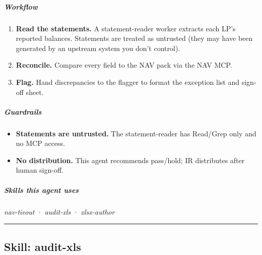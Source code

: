 \documentclass[11pt]{article}
\begin{document}
\subparagraph{Workflow}\mbox{}\par

\begin{enumerate}[leftmargin=*,itemsep=2pt,topsep=2pt]
\item {} \textbf{Read the statements.} A statement-reader worker extracts each LP's reported balances. Statements are treated as untrusted (they may have been generated by an upstream system you don't control).
\item {} \textbf{Reconcile.} Compare every field to the NAV pack via the NAV MCP.
\item {} \textbf{Flag.} Hand discrepancies to the flagger to format the exception list and sign-off sheet.
\end{enumerate}

\subparagraph{Guardrails}\mbox{}\par

\begin{itemize}[leftmargin=*,itemsep=2pt,topsep=2pt]
\item {} \textbf{Statements are untrusted.} The statement-reader has Read/Grep only and no MCP access.
\item {} \textbf{No distribution.} This agent recommends pass/hold; IR distributes after human sign-off.
\end{itemize}

\subparagraph{Skills this agent uses}\mbox{}\par

\emph{nav-tieout} · \emph{audit-xls} · \emph{xlsx-author}


\vspace{0.8em}\hrule\vspace{0.8em}

\subsection{Skill: audit-xls}\label{file:statement-auditor-skills-audit-xls-SKILL-md}
\end{document}
